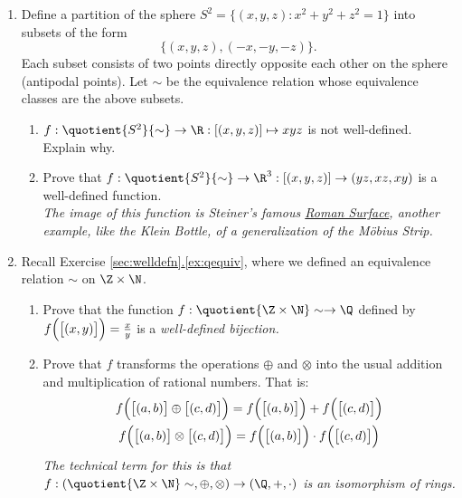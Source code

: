 \begin{enumerate}
	\item Define a partition of the sphere $S^2=\bigl\{(x,y,z):x^2+y^2+z^2=1\bigr\}$ into subsets of the form
	\[\bigl\{(x,y,z),(-x,-y,-z)\bigr\}.\]
	Each subset consists of two points directly opposite each other on the sphere (antipodal points). Let $\sim$ be the equivalence relation whose equivalence classes are the above subsets.
		\begin{enumerate}
	  	\item $f:\quotient{S^2}{\sim}\to\R:[(x,y,z)]\mapsto xyz$ is not well-defined. Explain why.
	  	\item Prove that $f:\quotient{S^2}{\sim}\to\R^3:[(x,y,z)]\to(yz,xz,xy)$ is a well-defined function.\\
			\emph{The image of this function is Steiner's famous \href{http://en.wikipedia.org/wiki/Roman_surface}{Roman Surface}, another example, like the Klein Bottle, of a generalization of the M\"obius Strip.}
		\end{enumerate}
		
		\item Recall Exercise \hyperref[ex:qequiv]{\ref*{sec:welldefn}.\ref*{ex:qequiv}}, where we defined an equivalence relation $\sim$ on $\Z\times\N$.
		\begin{enumerate}
			\item	Prove that the function $f:\quotient{\Z\times\N}\sim\to\Q$ defined by $f\Bigl(\bigl[(x,y)\bigr]\Bigr)=\frac xy$ is a \emph{well-defined bijection.}
			\item Prove that $f$ transforms the operations $\oplus$ and $\otimes$ into the usual addition and multiplication of rational numbers. That is:
			\begin{gather*}
			f\Bigl(\bigl[(a,b)\bigr]\oplus\bigl[(c,d)\bigr]\Bigr)=f\Bigl(\bigl[(a,b)\bigr]\Bigr)+f\Bigl(\bigl[(c,d)\bigr]\Bigr)\\
			f\Bigl(\bigl[(a,b)\bigr]\otimes\bigl[(c,d)\bigr]\Bigr)=f\Bigl(\bigl[(a,b)\bigr]\Bigr)\cdot f\Bigl(\bigl[(c,d)\bigr]\Bigr)
			\end{gather*}
			\emph{The technical term for this is that $f:\left(\quotient{\Z\times\N}\sim,\oplus,\otimes\right)\to(\Q,+,\cdot)$ is an isomorphism of rings.}
		\end{enumerate}
\end{enumerate}


